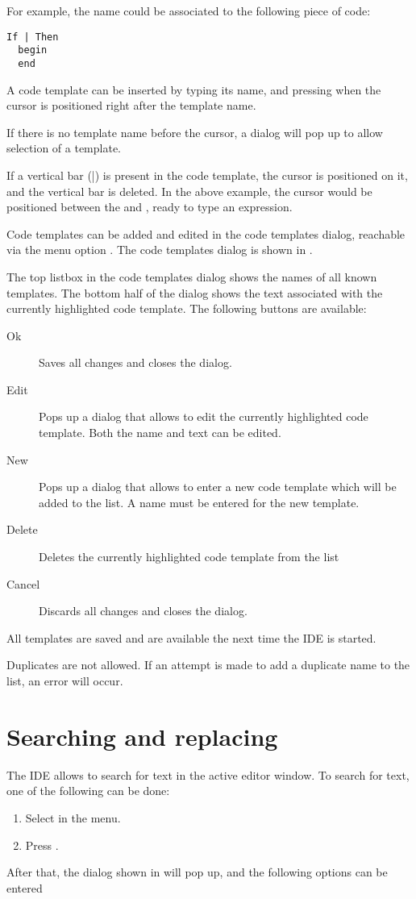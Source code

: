 For example, the name  could be associated to the following
piece of code:
\begin{verbatim}
If | Then
  begin
  end
\end{verbatim}
A code template can be inserted by typing its name, and pressing 
when the cursor is positioned right after the template name.

If there is no template name before the cursor, a dialog will pop up to
allow selection of a template.

If a vertical bar (|) is present in the code template, the cursor is positioned
on it, and the vertical bar is deleted. In the above example, the cursor would be
positioned between the  and , ready to type an expression.

Code templates can be added and edited in the code templates dialog, reachable via
the menu option .
The code templates dialog is shown in .


The top listbox in the code templates dialog shows the names of all
known templates. The bottom half of the dialog shows the text associated
with the currently highlighted code template.
The following buttons are available:
\begin{description}
\item[Ok] Saves all changes and closes the dialog.
\item[Edit] Pops up a dialog that allows to edit the currently
highlighted code template. Both the name and text can be edited.
\item[New] Pops up a dialog that allows to enter a new code template
which will be added to the list. A name must be entered for the new
template.
\item[Delete] Deletes the currently highlighted code template from the list
\item[Cancel] Discards all changes and closes the dialog.
\end{description}
All templates are saved and are available the next time the IDE is started.
\begin{remark}
Duplicates are not allowed. If an attempt is made to add a duplicate name
to the list, an error will occur.
\end{remark}

\section{Searching and replacing}
\label{se:searching}
The IDE allows to search for text in the active editor window.
To search for text, one of the following can be done:
\begin{enumerate}
\item Select  in the menu.
\item Press .
\end{enumerate}
After that, the dialog shown in  will pop up,
and the following options can be entered

